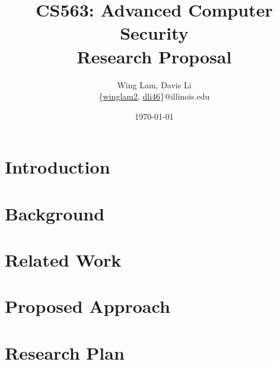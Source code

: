 \documentclass{article}
\title{\vspace{-3.0cm}CS563: Advanced Computer Security \\ Research Proposal}
\author{Wing Lam, Davis Li \\
\{\href{mailto:winglam2@illinois.edu}{winglam2},
\href{mailto:dli46@illinois.edu}{dli46}\}@illinois.edu}
\date{\today}
\begin{document}
\maketitle

\begin{multicols}{2}

\begin{abstract}
\blindtext
\end{abstract}


\section{Introduction}

\label{introduction}

\section{Background}

\label{background}

\section{Related Work}

\label{related-work}

\section{Proposed Approach}

\label{proposed-approach}

\section{Research Plan}

\label{proposed-plan}

\printbibliography

\end{multicols}
\end{document}
